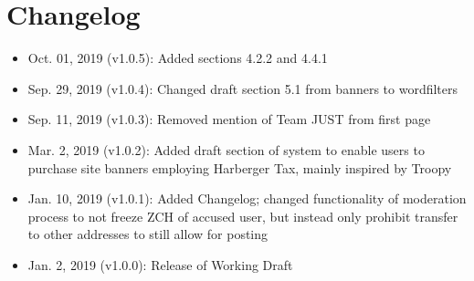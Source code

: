 \documentclass[a4paper]{article}
\begin{document}
\section*{Changelog}
\begin{itemize}
\item Oct. 01, 2019 (v1.0.5): Added sections 4.2.2 and 4.4.1
\item Sep. 29, 2019 (v1.0.4): Changed draft section 5.1 from banners to wordfilters
\item Sep. 11, 2019 (v1.0.3): Removed mention of Team JUST from first page
\item Mar. 2, 2019 (v1.0.2): Added draft section of system to enable users to purchase site banners employing Harberger Tax, mainly inspired by Troopy
\item Jan. 10, 2019 (v1.0.1): Added Changelog; changed functionality of moderation process to not freeze ZCH of accused user, but instead only prohibit transfer to other addresses to still allow for posting
\item Jan. 2, 2019 (v1.0.0): Release of Working Draft
\end{itemize}
\end{document}
